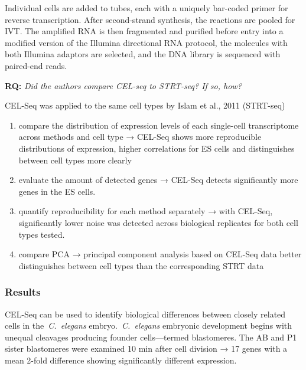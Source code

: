 Individual cells are added to tubes, each with a uniquely bar-coded
primer for reverse transcription. After second-strand synthesis, the
reactions are pooled for IVT. The amplified RNA is then fragmented and
purified before entry into a modified version of the Illumina
directional RNA protocol, the molecules with both Illumina adaptors are
selected, and the DNA library is sequenced with paired-end reads.

\begin{tcolorbox}
[width=\linewidth, sharp corners=all, colback=white!95!black]

\textbf{RQ: }\emph{Did the authors compare CEL-seq to STRT-seq? If so, how?}

CEL-Seq was applied to the same cell types by Islam et al., 2011
(STRT-seq)

\begin{enumerate}
\def\labelenumi{\arabic{enumi}.}
\tightlist
\item
  compare the distribution of expression levels of each single-cell
  transcriptome across methods and cell type → CEL-Seq shows more
  reproducible distributions of expression, higher correlations for ES
  cells and distinguishes between cell types more clearly
\item
  evaluate the amount of detected genes → CEL-Seq detects significantly
  more genes in the ES cells.
\item
  quantify reproducibility for each method separately → with CEL-Seq,
  significantly lower noise was detected across biological replicates
  for both cell types tested.
\item
  compare PCA → principal component analysis based on CEL-Seq data
  better distinguishes between cell types than the corresponding STRT
  data
\end{enumerate}
\end{tcolorbox}

\hypertarget{results-2}{%
\subsubsection{Results}\label{results-2}}

CEL-Seq can be used to identify biological differences between closely
related cells in the~\emph{C.~elegans} embryo.~\emph{C.~elegans}
embryonic development begins with unequal cleavages producing founder
cells---termed blastomeres. The AB and P1 sister blastomeres were
examined 10 min after cell division → 17 genes with a mean 2-fold
difference showing significantly different expression.

